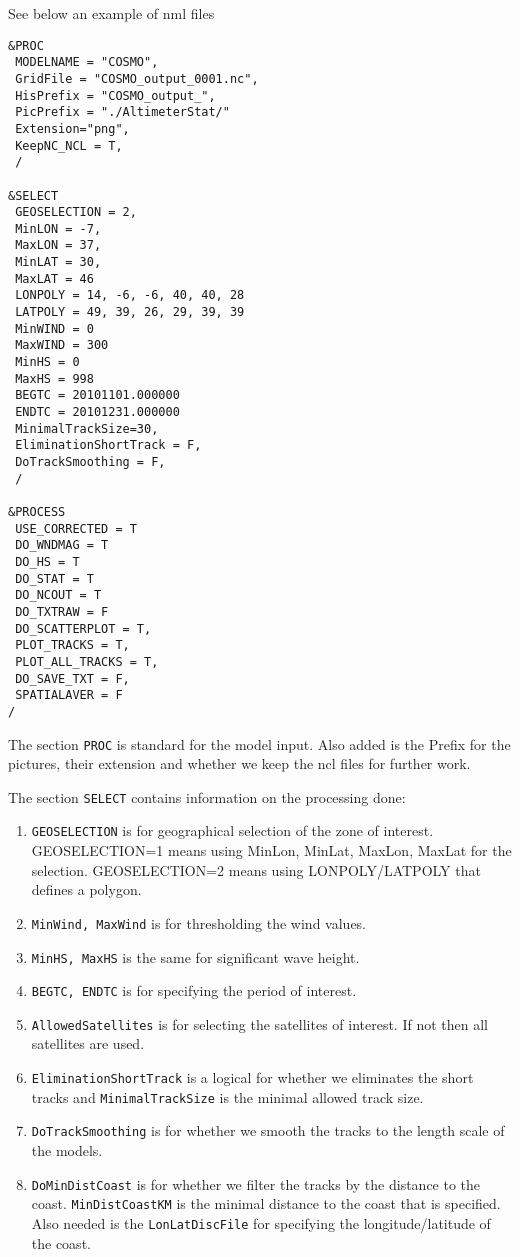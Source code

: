 \documentclass[12pt]{amsart}
\begin{document}
See below an example of nml files
\begin{verbatim}
&PROC
 MODELNAME = "COSMO",
 GridFile = "COSMO_output_0001.nc",
 HisPrefix = "COSMO_output_",
 PicPrefix = "./AltimeterStat/"
 Extension="png",
 KeepNC_NCL = T,
 /

&SELECT
 GEOSELECTION = 2,
 MinLON = -7, 
 MaxLON = 37, 
 MinLAT = 30, 
 MaxLAT = 46
 LONPOLY = 14, -6, -6, 40, 40, 28
 LATPOLY = 49, 39, 26, 29, 39, 39
 MinWIND = 0
 MaxWIND = 300
 MinHS = 0 
 MaxHS = 998
 BEGTC = 20101101.000000
 ENDTC = 20101231.000000
 MinimalTrackSize=30,
 EliminationShortTrack = F,
 DoTrackSmoothing = F,
 /

&PROCESS
 USE_CORRECTED = T
 DO_WNDMAG = T
 DO_HS = T
 DO_STAT = T
 DO_NCOUT = T
 DO_TXTRAW = F
 DO_SCATTERPLOT = T,
 PLOT_TRACKS = T,
 PLOT_ALL_TRACKS = T,
 DO_SAVE_TXT = F,
 SPATIALAVER = F
/
\end{verbatim}
The section {\tt PROC} is standard for the model input. Also added is the Prefix for the pictures, their extension and whether we keep the ncl files for further work.

The section {\tt SELECT} contains information on the processing done:
\begin{enumerate}
\item {\tt GEOSELECTION} is for geographical selection of the zone of interest. GEOSELECTION=1 means using MinLon, MinLat, MaxLon, MaxLat for the selection. GEOSELECTION=2 means using LONPOLY/LATPOLY that defines a polygon.
\item {\tt MinWind, MaxWind} is for thresholding the wind values.
\item {\tt MinHS, MaxHS} is the same for significant wave height.
\item {\tt BEGTC, ENDTC} is for specifying the period of interest.
\item {\tt AllowedSatellites} is for selecting the satellites of interest. If not then all satellites are used.
\item {\tt EliminationShortTrack} is a logical for whether we eliminates the short tracks and {\tt MinimalTrackSize} is the minimal allowed track size.
\item {\tt DoTrackSmoothing} is for whether we smooth the tracks to the length scale of the models.
\item {\tt DoMinDistCoast} is for whether we filter the tracks by the distance to the coast. {\tt MinDistCoastKM} is the minimal distance to the coast that is specified. Also needed is the {\tt LonLatDiscFile} for specifying the longitude/latitude of the coast.
\end{enumerate}
\end{document}

